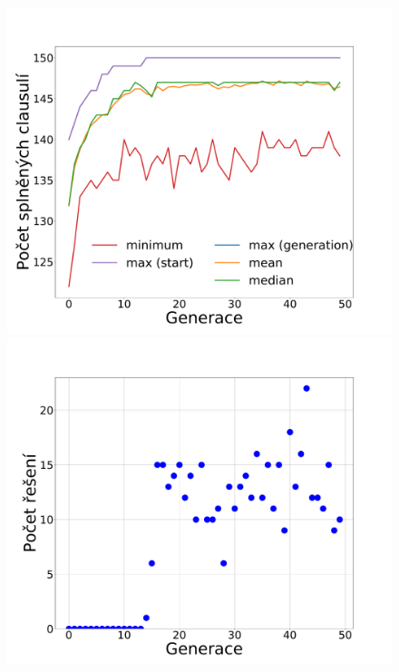 \documentclass[11pt]{article}
\begin{document}
\begin{figure}
\begin{minipage}[c]{0.325\textwidth}
        \centering\includegraphics[width=\textwidth]{img/gc2p.pdf} 
    \end{minipage}
    \begin{minipage}[c]{0.325\textwidth}
        \centering \includegraphics[width=\textwidth]{img/gc2s.pdf} 
    \end{minipage}
    \begin{minipage}[c]{0.325\textwidth}

\end{minipage}
\end{figure}
\end{document}
